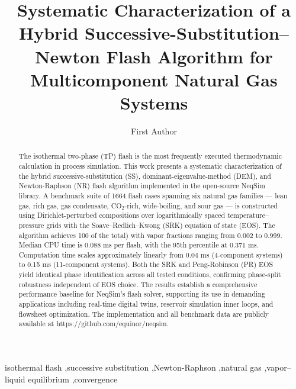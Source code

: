 \documentclass[review,3p]{custom}
\begin{document}
\linenumbers
\doublespacing

\begin{frontmatter}

\title{Systematic Characterization of a Hybrid Successive-Substitution–Newton Flash Algorithm for Multicomponent Natural Gas Systems}

\author[inst1]{First Author}


\begin{abstract}
The isothermal two-phase (TP) flash is the most frequently executed thermodynamic
calculation in process simulation. This work presents a systematic characterization
of the hybrid successive-substitution (SS), dominant-eigenvalue-method (DEM), and
Newton-Raphson (NR) flash algorithm implemented in the open-source NeqSim library.
A benchmark suite of 1664 flash cases spanning six natural gas families — lean gas,
rich gas, gas condensate, CO$_2$-rich, wide-boiling, and sour gas — is constructed
using Dirichlet-perturbed compositions over logarithmically spaced temperature–pressure
grids with the Soave–Redlich–Kwong (SRK) equation of state (EOS). The algorithm
achieves 100%
of the total) with vapor fractions ranging from 0.002 to 0.999. Median CPU time is
0.088 ms per flash, with the 95th percentile at 0.371 ms. Computation time scales
approximately linearly from 0.04 ms (4-component systems) to 0.15 ms (11-component
systems). Both the SRK and Peng-Robinson (PR) EOS yield identical phase identification
across all tested conditions, confirming phase-split robustness independent of EOS choice.
The results establish a comprehensive performance baseline for NeqSim's flash solver,
supporting its use in demanding applications including real-time digital twins, reservoir
simulation inner loops, and flowsheet optimization. The implementation and all benchmark
data are publicly available at https://github.com/equinor/neqsim.
\end{abstract}

\begin{keyword}
isothermal flash \sep  successive substitution \sep  Newton-Raphson \sep  natural gas \sep  vapor–liquid equilibrium \sep  convergence
\end{keyword}

\end{frontmatter}
\end{document}
